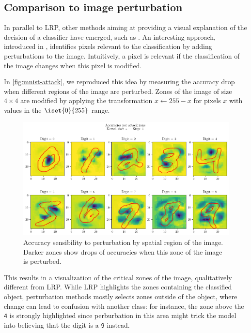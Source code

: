 \documentclass[twocolumn]{../cs-classes/cs-classes}
\newcommand*{\1}{\digitsbb{1}}
\newcommand*{\0}{\digitsbb{0}}
\begin{document}
\subsection{Comparison to image perturbation}
In parallel to LRP, other methods aiming at providing a visual explanation of the decision of a classifier have emerged, such as \cite{inverting,visualizing-cnn}. An interesting approach, introduced in \cite{fong2017interpretable}, identifies pixels relevant to the classification by adding perturbations to the image. Intuitively, a pixel is relevant if the classification of the image changes when this pixel is modified. 

In \autoref{fig:mnist-attack}, we reproduced this idea by measuring the accuracy drop when different regions of the image are perturbed. Zones of the image of size $4\times4$ are modified by applying the transformation $x\longleftarrow255-x$ for pixels $x$ with values in the $\iset{0}{255}$ range. 
\begin{figure}[H]
    \centering
    \includegraphics[width=\linewidth]{attacks.png}
    \caption{Accuracy sensibility to perturbation by spatial region of the image. Darker zones show drops of accuracies when this zone of the image is perturbed.}
    \label{fig:mnist-attack}
\end{figure}
This results in a visualization of the critical zones of the image, qualitatively different from LRP. While LRP highlights the zones containing the classified object, perturbation methods mostly selects zones outside of the object, where change can lead to confusion with another class: for instance, the zone above the \texttt{4} is strongly highlighted since perburbation in this area might trick the model into believing that the digit is a \texttt{9} instead.
\end{document}
